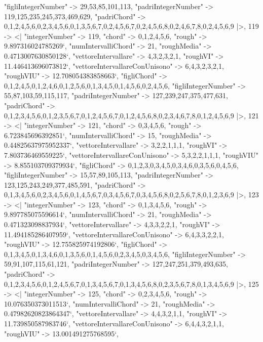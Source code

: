 \documentclass[
]{article}
\begin{document}
\begin{DatasetVerbatim}
    "figliIntegerNumber" -> {29,53,85,101,113},
    "padriIntegerNumber" -> {119,125,235,245,373,469,629},
    "padriChord" -> {{0,1,2,4,5,6},{0,2,3,4,5,6},{0,1,3,5,6,7},{0,2,4,5,6,7},{0,2,4,5,6,8},{0,2,4,6,7,8},{0,2,4,5,6,9}}
  |>,
  119 -> <|
    "integerNumber" -> 119,
    "chord" -> {0,1,2,4,5,6},
    "rough" -> 9.897316024785269`,
    "numIntervalliChord" -> 21,
    "roughMedia" -> 0.4713007630850128`,
    "vettoreIntervallare" -> {4,3,2,3,2,1},
    "roughVI" -> 11.446413696073812`,
    "vettoreIntervallareConUnisono" -> {6,4,3,2,3,2,1},
    "roughVIU" -> 12.708054383858663`,
    "figliChord" -> {{0,1,2,4,5},{0,1,2,4,6},{0,1,2,5,6},{0,1,3,4,5},{0,1,4,5,6},{0,2,4,5,6}},
    "figliIntegerNumber" -> {55,87,103,59,115,117},
    "padriIntegerNumber" -> {127,239,247,375,477,631},
    "padriChord" -> {{0,1,2,3,4,5,6},{0,1,2,3,5,6,7},{0,1,2,4,5,6,7},{0,1,2,4,5,6,8},{0,2,3,4,6,7,8},{0,1,2,4,5,6,9}}
  |>,
  121 -> <|
    "integerNumber" -> 121,
    "chord" -> {0,3,4,5,6},
    "rough" -> 6.723845696392851`,
    "numIntervalliChord" -> 15,
    "roughMedia" -> 0.44825637975952337`,
    "vettoreIntervallare" -> {3,2,2,1,1,1},
    "roughVI" -> 7.803736469559225`,
    "vettoreIntervallareConUnisono" -> {5,3,2,2,1,1,1},
    "roughVIU" -> 8.855103709379934`,
    "figliChord" -> {{0,1,2,3},{0,3,4,5},{0,3,4,6},{0,3,5,6},{0,4,5,6}},
    "figliIntegerNumber" -> {15,57,89,105,113},
    "padriIntegerNumber" -> {123,125,243,249,377,485,591},
    "padriChord" -> {{0,1,3,4,5,6},{0,2,3,4,5,6},{0,1,4,5,6,7},{0,3,4,5,6,7},{0,3,4,5,6,8},{0,2,5,6,7,8},{0,1,2,3,6,9}}
  |>,
  123 -> <|
    "integerNumber" -> 123,
    "chord" -> {0,1,3,4,5,6},
    "rough" -> 9.897785075596614`,
    "numIntervalliChord" -> 21,
    "roughMedia" -> 0.471323098837934`,
    "vettoreIntervallare" -> {4,3,3,2,2,1},
    "roughVI" -> 11.494185286407959`,
    "vettoreIntervallareConUnisono" -> {6,4,3,3,2,2,1},
    "roughVIU" -> 12.755825974192806`,
    "figliChord" -> {{0,1,3,4,5},{0,1,3,4,6},{0,1,3,5,6},{0,1,4,5,6},{0,2,3,4,5},{0,3,4,5,6}},
    "figliIntegerNumber" -> {59,91,107,115,61,121},
    "padriIntegerNumber" -> {127,247,251,379,493,635},
    "padriChord" -> {{0,1,2,3,4,5,6},{0,1,2,4,5,6,7},{0,1,3,4,5,6,7},{0,1,3,4,5,6,8},{0,2,3,5,6,7,8},{0,1,3,4,5,6,9}}
  |>,
  125 -> <|
    "integerNumber" -> 125,
    "chord" -> {0,2,3,4,5,6},
    "rough" -> 10.076350373011513`,
    "numIntervalliChord" -> 21,
    "roughMedia" -> 0.47982620823864347`,
    "vettoreIntervallare" -> {4,4,3,2,1,1},
    "roughVI" -> 11.739850587983746`,
    "vettoreIntervallareConUnisono" -> {6,4,4,3,2,1,1},
    "roughVIU" -> 13.001491275768595`,

\end{DatasetVerbatim}
\end{document}
